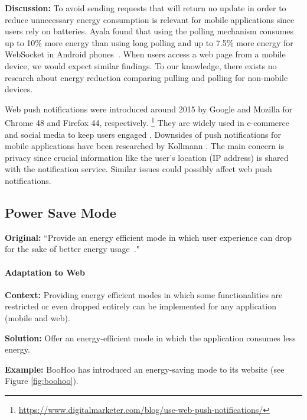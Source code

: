 

\textbf{Discussion:} To avoid sending requests that will return no update in order to reduce unnecessary energy consumption is relevant for mobile applications since users rely on batteries. Ayala \etal found that using the polling mechanism consumes up to 10\% more energy than using long polling and up to 7.5\%  more energy for WebSocket in Android phones~\cite{Ayala2019}. When users access a web page from a mobile device, we would expect similar findings. To our knowledge, there exists no research about energy reduction comparing pulling and polling for non-mobile devices.

Web push notifications were introduced around 2015 by Google and Mozilla for Chrome 48 and Firefox 44, respectively. \footnote{\url{https://www.digitalmarketer.com/blog/use-web-push-notifications/}} They are widely used in e-commerce and social media to keep users engaged \cite{blog-web-push-notifications}. Downsides of push notifications for mobile applications have been researched by Kollmann \etal \cite{Kollmann2017}. The main concern is privacy since crucial information like the user's location (\ie IP address) is shared with the notification service. Similar issues could possibly affect web push notifications.

\subsection{Power Save Mode} \label{sec:patterns-PowerSaveMode}
\textbf{Original:} ``Provide an energy efficient mode in which user experience can drop for the sake of better energy usage~\cite{cruz2019catalog}."

\paragraph{Adaptation to Web}\mbox{}

\textbf{Context:} Providing energy efficient modes in which some functionalities are restricted or even dropped entirely can be implemented for any application (mobile and web).

\textbf{Solution:} Offer an energy-efficient mode in which the application consumes less energy.

\textbf{Example:} BooHoo has introduced an energy-saving mode to its website (see Figure \ref{fig:boohoo}).

